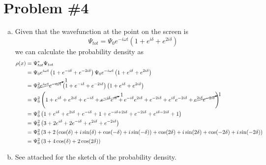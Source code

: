 \documentclass[11pt]{article}
\numberwithin{equation}{section}
\begin{document}
\section{Problem \#4}
\begin{enumerate}[(a)]
\item
Given that the wavefunction at the point on the screen is
$$\Psi_{tot} = \Psi_0e^{-i\omega t}\left(1+e^{i\delta}+e^{2i\delta}\right)$$
we can calculate the probability density as
\begin{align*}
\rho(x) &= \Psi_{tot}^*\Psi_{tot}\\
&= \Psi_0e^{i\omega t}\left(1+e^{-i\delta}+e^{-2i\delta}\right)\Psi_0e^{-i\omega t}\left(1+e^{i\delta}+e^{2i\delta}\right)\\
&= \Psi_0^2\cancelto{1}{e^{i\omega t}e^{-i\omega t}}\left(1+e^{-i\delta}+e^{-2i\delta}\right)\left(1+e^{i\delta}+e^{2i\delta}\right)\\
&= \Psi_0^2\left(1+e^{i\delta}+e^{2i\delta} + e^{-i\delta}+\cancelto{1}{e^{-i\delta}e^{i\delta}}+e^{-i\delta}e^{2i\delta} + e^{-2i\delta}+e^{i\delta}e^{-2i\delta}+\cancelto{1}{e^{2i\delta}e^{-2i\delta}}\right)\\
&= \Psi_0^2\left(1+e^{i\delta}+e^{2i\delta} + e^{-i\delta}+1+e^{-i\delta+2i\delta} + e^{-2i\delta}+e^{i\delta-2i\delta}+1\right)\\
&= \Psi_0^2\left(3+2e^{i\delta}+2e^{-i\delta} + e^{2i\delta} + e^{-2i\delta}\right)\\
&= \Psi_0^2\left(3+2\left(\cos(\delta)+i\sin(\delta)+\cos(-\delta)+i\sin(-\delta)\right) + \cos(2\delta)+i\sin(2\delta) + \cos(-2\delta) + i\sin(-2\delta)\right)\\
&= \Psi_0^2\left(3+4\cos(\delta) + 2\cos(2\delta)\right)
\end{align*}

\item
See attached for the sketch of the probability density.


\end{enumerate}
\end{document}
